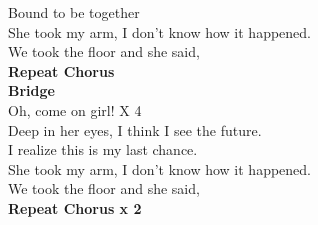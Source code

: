  Bound to be together\\
She  took my  arm, I don't know  how it  happened.\\
We  took the  floor and she  said,\\
\textbf{Repeat Chorus}\\
\textbf{Bridge}\\
 Oh, come on girl!      X 4\\
 Deep in her  eyes, I think I  see the  future.\\
I  realize  this is my last  chance.\\
She  took my  arm, I don't know  how it  happened.\\
We  took the  floor and she  said,\\
\textbf{Repeat Chorus x 2}

